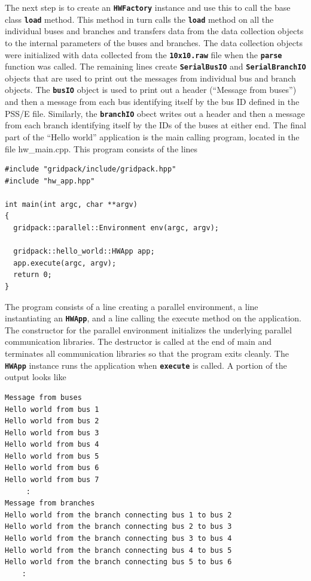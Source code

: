 \documentclass[12pt]{report} %
\begin{document}
The next step is to create an \texttt{\textbf{HWFactory}} instance and use this to call the base class \texttt{\textbf{load}} method. This method in turn calls the \texttt{\textbf{load}} method on all the individual buses and branches and transfers data from the data collection objects to the internal parameters of the buses and branches. The data collection objects were initialized with data collected from the \texttt{\textbf{10x10.raw}} file when the \texttt{\textbf{parse}} function was called. The remaining lines create \texttt{\textbf{SerialBusIO}} and \texttt{\textbf{SerialBranchIO}} objects that are used to print out the messages from individual bus and branch objects. The \texttt{\textbf{busIO}} object is used to print out a header (``Message from buses'') and then a message from each bus identifying itself by the bus ID defined in the PSS/E file. Similarly, the \texttt{\textbf{branchIO}} obect writes out a header and then a message from each branch identifying itself by the IDs of the buses at either end.
The final part of the ``Hello world'' application is the main calling program, located in the file hw\_main.cpp. This program consists of the lines

{
\color{red}
\begin{Verbatim}[fontseries=b]
#include "gridpack/include/gridpack.hpp"
#include "hw_app.hpp"

int main(int argc, char **argv)
{
  gridpack::parallel::Environment env(argc, argv);

  gridpack::hello_world::HWApp app;
  app.execute(argc, argv);
  return 0;
}
\end{Verbatim}
}

The program consists of a line creating a parallel environment, a line instantiating an \texttt{\textbf{HWApp}}, and a line calling the execute method on the application. The constructor for the parallel environment initializes the underlying parallel communication libraries. The destructor is called at the end of main and terminates all communication libraries so that the program exits cleanly. The \texttt{\textbf{HWApp}} instance runs the application when \texttt{\textbf{execute}} is called. A portion of the output looks like

{
\color{red}
\begin{Verbatim}[fontseries=b]
Message from buses
Hello world from bus 1
Hello world from bus 2
Hello world from bus 3
Hello world from bus 4
Hello world from bus 5
Hello world from bus 6
Hello world from bus 7
     :
Message from branches
Hello world from the branch connecting bus 1 to bus 2
Hello world from the branch connecting bus 2 to bus 3
Hello world from the branch connecting bus 3 to bus 4
Hello world from the branch connecting bus 4 to bus 5
Hello world from the branch connecting bus 5 to bus 6
    :
\end{Verbatim}
}
\end{document}
